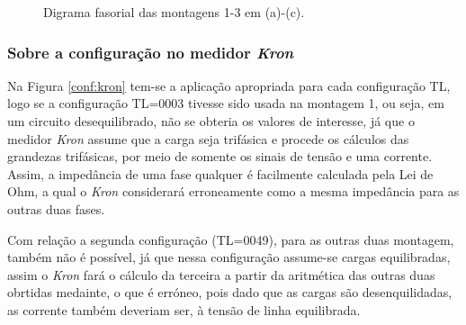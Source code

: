 \documentclass[a4paper,12pt,oneside,openany,table,xcdraw]{article}
\begin{document}
\begin{figure}[H]
\hfill
{}
\caption{Digrama fasorial das montagens 1-3 em (a)-(c).}
\label{fasores}
\end{figure}
\vspace{0.2cm}

\subsubsection{Sobre a configuração no medidor \emph{Kron}}
Na Figura \ref{conf:kron} tem-se a aplicação apropriada para cada configuração TL, logo se a configuração TL=0003 tivesse sido usada na montagem 1, ou seja, em um circuito desequilibrado, não se obteria os valores de interesse, já que o medidor \emph{Kron} assume que a carga seja trifásica e procede os cálculos das grandezas trifásicas, por meio de somente os sinais de tensão e uma corrente. Assim, a impedância de uma fase qualquer é facilmente calculada pela Lei de Ohm, a qual o \emph{Kron} considerará erroneamente como a mesma impedância para as outras duas fases.

Com relação a segunda configuração (TL=0049), para as outras duas montagem, também não é possível, já que nessa configuração assume-se cargas equilibradas, assim o \emph{Kron} fará o cálculo da  terceira a partir da aritmética das outras duas obrtidas medainte, o que é erróneo, pois dado que as cargas são desenquilidadas, as corrente também deveriam ser, à tensão de linha equilibrada.  
\end{document}
